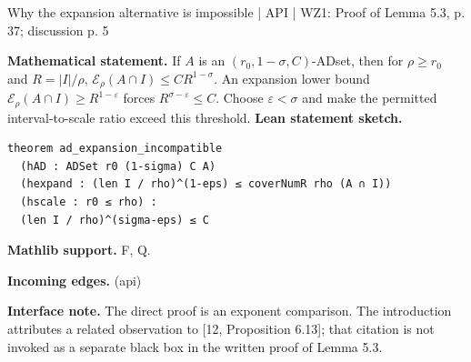 \documentclass[10pt,a4paper]{article}
\newcommand{\nodecard}[1]{\hyperlink{node-#1}{\texttt{\detokenize{#1}}}}
\begin{document}
\begin{minipage}{\linewidth}
\hypertarget{node-Iadgap}{}
\begin{tcolorbox}[colback=white,colframe=regularityfg,colbacktitle=regularitybg,coltitle=ink,boxrule=0.45pt,arc=1.6mm,left=3mm,right=3mm,top=2mm,bottom=2mm,title={\sffamily\bfseries AD exponent gap \hfill \texttt{Iadgap}}]
{\sffamily\small\color{muted}Why the expansion alternative is impossible | API | WZ1: Proof of Lemma 5.3, p. 37; discussion p. 5}\par
\textbf{Mathematical statement.} If $A$ is an $(r_0,1-\sigma,C)$-ADset, then for $\rho\ge r_0$ and $R=|I|/\rho$,
$\mathcal E_\rho(A\cap I)\le C R^{1-\sigma}$.
An expansion lower bound $\mathcal E_\rho(A\cap I)\ge R^{1-\varepsilon}$ forces $R^{\sigma-\varepsilon}\le C$.
Choose $\varepsilon<\sigma$ and make the permitted interval-to-scale ratio exceed this threshold.
\smallskip\textbf{Lean statement sketch.}
\begin{Verbatim}[fontsize=\small,breaklines=true,breakanywhere=true,tabsize=2]
theorem ad_expansion_incompatible
  (hAD : ADSet r0 (1-sigma) C A)
  (hexpand : (len I / rho)^(1-eps) ≤ coverNumR rho (A ∩ I))
  (hscale : r0 ≤ rho) :
  (len I / rho)^(sigma-eps) ≤ C
\end{Verbatim}
{\footnotesize\textbf{Mathlib support.} F, Q.\par
\textbf{Incoming edges.} \nodecard{DAD} (api)\par}
{\footnotesize\textbf{Interface note.} The direct proof is an exponent comparison. The introduction attributes a related observation to [12, Proposition 6.13]; that citation is not invoked as a separate black box in the written proof of Lemma 5.3.}
\end{tcolorbox}\end{minipage}\par\medskip
\end{document}
